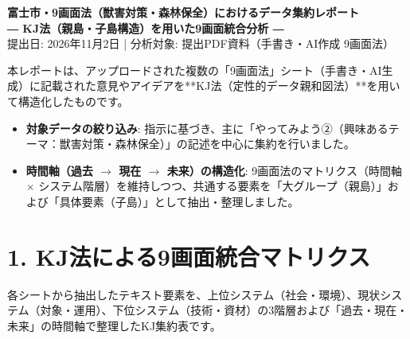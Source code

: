 \documentclass[uplatex, 11pt, a4paper]{bxjsarticle}
\begin{document}
\begin{center}
    {\LARGE \textbf{\color{primary} 富士市・9画面法（獣害対策・森林保全）におけるデータ集約レポート}}\\[6pt]
    {\large \textbf{― KJ法（親島・子島構造）を用いた9画面統合分析 ―}}\\[4pt]
    {\small 提出日: 2026年11月2日 \quad | \quad 分析対象: 提出PDF資料（手書き・AI作成 9画面法）}
\end{center}

\vspace{0.5em}

\begin{tcolorbox}[colback=bglight, colframe=primary, title=\textbf{集約・分析の基本方針}]
本レポートは、アップロードされた複数の「9画面法」シート（手書き・AI生成）に記載された意見やアイデアを**KJ法（定性的データ親和図法）**を用いて構造化したものです。
\begin{itemize}[label=•]
    \item \textbf{対象データの絞り込み}: 指示に基づき、主に「やってみよう②（興味あるテーマ：獣害対策・森林保全）」の記述を中心に集約を行いました。
    \item \textbf{時間軸（過去 $\rightarrow$ 現在 $\rightarrow$ 未来）の構造化}: 9画面法のマトリクス（時間軸 $\times$ システム階層）を維持しつつ、共通する要素を「大グループ（親島）」および「具体要素（子島）」として抽出・整理しました。
\end{itemize}
\end{tcolorbox}

\section*{1. KJ法による9画面統合マトリクス}

各シートから抽出したテキスト要素を、上位システム（社会・環境）、現状システム（対象・運用）、下位システム（技術・資材）の3階層および「過去・現在・未来」の時間軸で整理したKJ集約表です。
\end{document}
